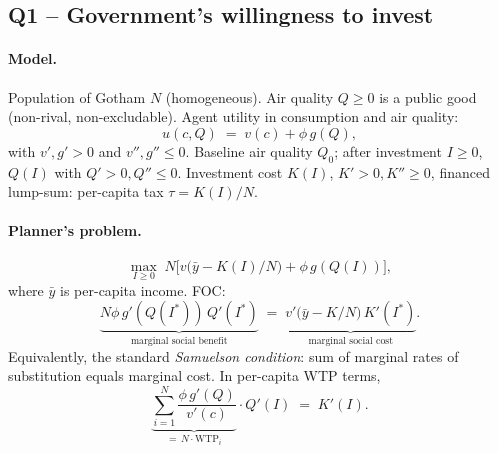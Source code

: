 \documentclass[11pt,a4paper]{article}
\begin{document}
\subsection*{Q1 -- Government's willingness to invest}

\paragraph{Model.}
Population of Gotham $N$ (homogeneous). Air quality $Q\ge 0$ is a public good (non-rival, non-excludable). Agent utility in consumption and air quality:
\[
u(c,Q)\;=\;v(c)+\phi\,g(Q),
\]
with $v',g'>0$ and $v'',g''\le 0$. Baseline air quality $Q_{0}$; after investment $I\ge 0$, $Q(I)$ with $Q'>0,Q''\le 0$. Investment cost $K(I)$, $K'>0,K''\ge 0$, financed lump-sum: per-capita tax $\tau=K(I)/N$.

\paragraph{Planner's problem.}
\begin{equation}
\max_{I\ge 0}\;N\bigl[v\bigl(\bar y-K(I)/N\bigr)+\phi\,g(Q(I))\bigr],
\label{eq:q4_obj}
\end{equation}
where $\bar y$ is per-capita income. FOC:
\begin{equation}
\underbrace{N\phi\,g'(Q(I^{*}))\,Q'(I^{*})}_{\text{marginal social benefit}}
\;=\;
\underbrace{v'\bigl(\bar y-K/N\bigr)\,K'(I^{*})}_{\text{marginal social cost}}.
\label{eq:q4_FOC}
\end{equation}
Equivalently, the standard \emph{Samuelson condition}: sum of marginal rates of substitution equals marginal cost. In per-capita WTP terms,
\begin{equation}
\underbrace{\sum_{i=1}^{N}\frac{\phi\,g'(Q)}{v'(c)}}_{=\,N\cdot\text{WTP}_{i}}\cdot Q'(I)\;=\;K'(I).
\label{eq:q4_samuel}
\end{equation}
\end{document}
